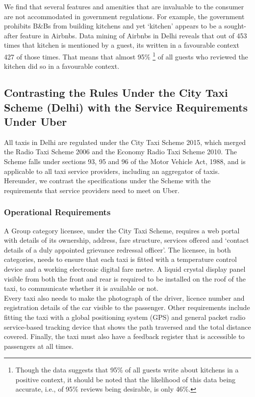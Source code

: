 \documentclass[a4paper, 12pt]{article}
\begin{document}
We find that several features and amenities that are invaluable to the consumer are not accommodated in government regulations. For example, the government prohibits B\&Bs from building kitchens and yet ‘kitchen’ appears to be a sought-after feature in Airbnbs. Data mining of Airbnbs in Delhi reveals that out of 453 times that kitchen is mentioned by a guest, its written in a favourable context 427 of those times. That means that almost 95\% \footnote {Though the data suggests that 95\% of all guests write about kitchens in a positive context, it should be noted that the likelihood of this data being accurate, i.e., of 95\% reviews being desirable, is only 46\%.} of all guests who reviewed the kitchen did so in a favourable context.

\newpage

\subsection{Contrasting the Rules Under the City Taxi Scheme (Delhi) with the Service Requirements Under Uber}
All taxis in Delhi are regulated under the City Taxi Scheme 2015, which merged the Radio Taxi Scheme 2006 and the Economy Radio Taxi Scheme 2010. The Scheme falls under sections 93, 95 and 96 of the Motor Vehicle Act, 1988, and is applicable to all taxi service providers, including an aggregator of taxis. Hereunder, we contrast the specifications under the Scheme with the requirements that service providers need to meet on Uber.

\subsubsection{Operational Requirements}
A Group category licensee, under the City Taxi Scheme, requires a web portal with details of its ownership, address, fare structure, services offered and ‘contact details of a duly appointed grievance redressal officer’. The licensee, in both categories, needs to ensure that each taxi is fitted with a temperature control device and a working electronic digital fare metre. A liquid crystal display panel visible from both the front and rear is required to be installed on the roof of the taxi, to communicate whether it is available or not. \\ 

Every taxi also needs to make the photograph of the driver, licence number and registration details of the car visible to the passenger. Other requirements include fitting the taxi with a global positioning system (GPS) and general packet radio service-based tracking device that shows the path traversed and the total distance covered. Finally, the taxi must also have a feedback register that is accessible to passengers at all times.\\
\end{document}
